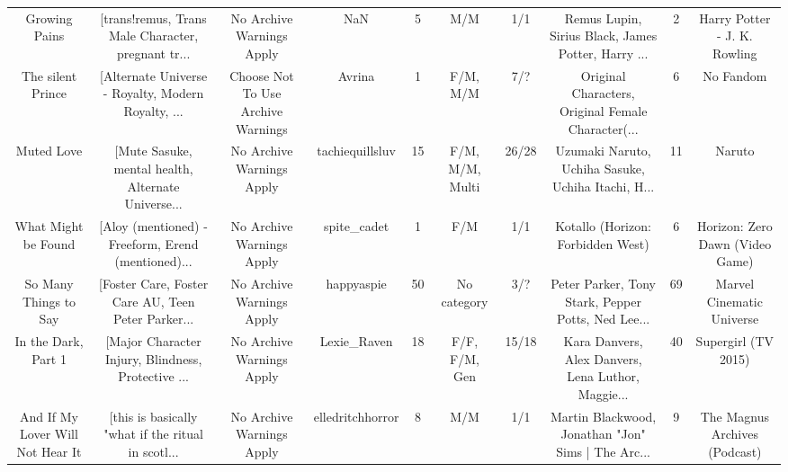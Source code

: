 \begin{table}[h!]
{\begin{tabular}{|c|c|c|c|c|c|c|c|c|c|}
                                     Growing Pains & [trans!remus, Trans Male Character, pregnant tr... &                          No Archive Warnings Apply &                                NaN &         5 &                              M/M &      1/1 & Remus Lupin, Sirius Black, James Potter, Harry ... &        2 &                       Harry Potter - J. K. Rowling \\
                                 The silent Prince & [Alternate Universe - Royalty, Modern Royalty, ... &                 Choose Not To Use Archive Warnings &                             Avrina &         1 &                         F/M, M/M &      7/? & Original Characters, Original Female Character(... &        6 &                                          No Fandom \\
                                        Muted Love & [Mute Sasuke, mental health, Alternate Universe... &                          No Archive Warnings Apply &                    tachiequillsluv &        15 &                  F/M, M/M, Multi &    26/28 & Uzumaki Naruto, Uchiha Sasuke, Uchiha Itachi, H... &       11 &                                             Naruto \\
                               What Might be Found & [Aloy (mentioned) - Freeform, Erend (mentioned)... &                          No Archive Warnings Apply &                        spite\_cadet &         1 &                              F/M &      1/1 &                  Kotallo (Horizon: Forbidden West) &        6 &                    Horizon: Zero Dawn (Video Game) \\
                             So Many Things to Say & [Foster Care, Foster Care AU, Teen Peter Parker... &                          No Archive Warnings Apply &                         happyaspie &        50 &                      No category &      3/? & Peter Parker, Tony Stark, Pepper Potts, Ned Lee... &       69 &                          Marvel Cinematic Universe \\
                               In the Dark, Part 1 & [Major Character Injury, Blindness, Protective ... &                          No Archive Warnings Apply &                        Lexie\_Raven &        18 &                    F/F, F/M, Gen &    15/18 & Kara Danvers, Alex Danvers, Lena Luthor, Maggie... &       40 &                                Supergirl (TV 2015) \\
                  And If My Lover Will Not Hear It & [this is basically "what if the ritual in scotl... &                          No Archive Warnings Apply &                   elledritchhorror &         8 &                              M/M &      1/1 & Martin Blackwood, Jonathan "Jon" Sims | The Arc... &        9 &                      The Magnus Archives (Podcast) \\

\end{tabular}}
\end{table}
